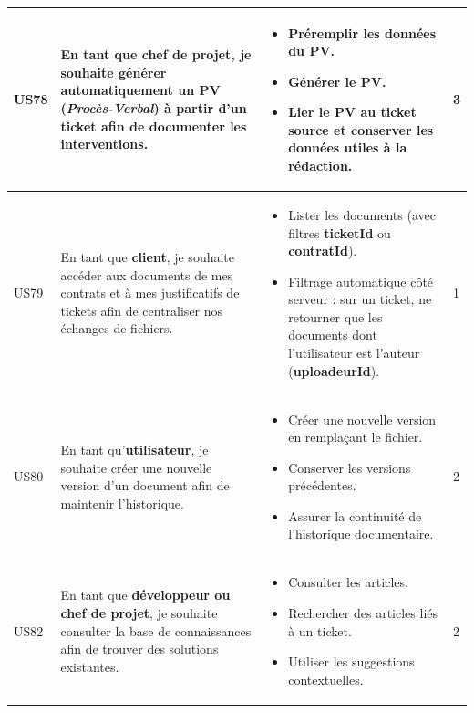 \begin{longtable}{|C{1cm}|L{5.6cm}|L{8cm}|C{0.85cm}|}
US78 & En tant que \textbf{chef de projet}, je souhaite générer automatiquement un PV (\textit{Procès-Verbal}) à partir d'un ticket afin de documenter les interventions. &
\begin{itemize}[nosep, left=0pt, label={$\bullet$}]
\item Préremplir les données du PV.
\item Générer le PV.
\item Lier le PV au ticket source et conserver les données utiles à la rédaction.
\end{itemize} & 3 \\
\hline

US79 & En tant que \textbf{client}, je souhaite accéder aux documents de mes contrats et à mes justificatifs de tickets afin de centraliser nos échanges de fichiers. &
\begin{itemize}[nosep, left=0pt, label={$\bullet$}]
\item Lister les documents (avec filtres \textbf{ticketId} ou \textbf{contratId}).
\item Filtrage automatique côté serveur : sur un ticket, ne retourner que les documents dont l'utilisateur est l'auteur (\textbf{uploadeurId}).
\end{itemize} & 1 \\
\hline

US80 & En tant qu'\textbf{utilisateur}, je souhaite créer une nouvelle version d'un document afin de maintenir l'historique. &
\begin{itemize}[nosep, left=0pt, label={$\bullet$}]
\item Créer une nouvelle version en remplaçant le fichier.
\item Conserver les versions précédentes.
\item Assurer la continuité de l'historique documentaire.
\end{itemize} & 2 \\
\hline

US82 & En tant que \textbf{développeur ou chef de projet}, je souhaite consulter la base de connaissances afin de trouver des solutions existantes. &
\begin{itemize}[nosep, left=0pt, label={$\bullet$}]
\item Consulter les articles.
\item Rechercher des articles liés à un ticket.
\item Utiliser les suggestions contextuelles.
\end{itemize} & 2 \\
\hline


\end{longtable}
